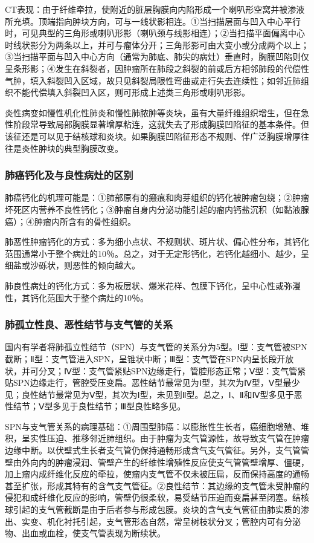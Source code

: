 CT表现：由于纤维牵拉，使附近的脏层胸膜向内陷形成一个喇叭形空窝并被渗液所充填。顶端指向肿块方向，可与一线状影相连。①当扫描层面与凹入中心平行时，可见典型的三角形或喇叭形影（喇叭颈与线影相连）；②当扫描平面偏离中心时线状影分为两条以上，并可与瘤体分开；三角形影可由大变小或分成两个以上；③当扫描平面与凹入中心方向（通常为肺底、肺尖的病灶）垂直时，胸膜凹陷则仅呈条形影；④发生在斜裂者，因肿瘤所在肺段之斜裂的前或后方相邻肺段的代偿性气肿，填入斜裂凹入区域，故只见斜裂局限性弯曲或走行失去连续性；如邻近肺组织不能代偿填入斜裂凹入区，则可形成上述类三角形或喇叭形影。

炎性病变如慢性机化性肺炎和慢性肺脓肿等炎块，虽有大量纤维组织增生，但在急性阶段常导致局部胸膜显著增厚粘连，这就失去了形成胸膜凹陷征的基本条件。但该征还是可以见于结核球和炎块。如果胸膜凹陷征形态不规则、伴广泛胸膜增厚往往是炎性肿块的典型胸膜改变。

\subsubsection{肺癌钙化及与良性病灶的区别}

肺癌钙化的机理可能是：①肺部原有的瘢痕和肉芽组织的钙化被肿瘤包绕；②肿瘤坏死区内营养不良性钙化；③肿瘤自身内分泌功能引起的瘤内钙盐沉积（如黏液腺癌）；④肿瘤内所含有的骨性组织。

肺恶性肿瘤钙化的方式：多为细小点状、不规则状、斑片状、偏心性分布，其钙化范围通常小于整个病灶的10％。总之，对于无定形钙化，若钙化越细小、越少，呈细盐或沙砾状，则恶性的倾向越大。

肺良性病灶的钙化方式：多为板层状、爆米花样、包膜下钙化，呈中心性或弥漫性，其钙化范围大于整个病灶的10％。

\subsubsection{肺孤立性良、恶性结节与支气管的关系}

国内有学者将肺孤立性结节（SPN）与支气管的关系分为5型。Ⅰ型：支气管被SPN截断；Ⅱ型：支气管进入SPN，呈锥状中断；Ⅲ型：支气管在SPN内呈长段开放状，并可分叉；Ⅳ型：支气管紧贴SPN边缘走行，管腔形态正常；Ⅴ型：支气管紧贴SPN边缘走行，管腔受压变扁。恶性结节最常见为Ⅰ型，其次为Ⅳ型，Ⅴ型最少见；良性结节最常见为Ⅴ型，其次为Ⅰ型，未见到Ⅱ型。总之，Ⅰ、Ⅱ和Ⅳ型多见于恶性结节；Ⅴ型多见于良性结节；Ⅲ型良性略多见。

SPN与支气管关系的病理基础：①周围型肺癌：以膨胀性生长者，癌细胞增殖、堆积，呈实性压迫、推移邻近肺组织。由于肿瘤为支气管源性，故导致支气管在肿瘤边缘中断。以伏壁式生长者支气管仍保持通畅形成含气支气管征。另外，支气管管壁由外向内的肿瘤浸润、管壁产生的纤维性增殖性反应使支气管管壁增厚、僵硬，加上瘤内成纤维化反应的牵拉，使瘤内支气管不仅未被压扁，反而保持高度的通畅甚至扩张，形成其特有的含气支气管征。②良性结节：其边缘的支气管未受肿瘤的侵犯和成纤维化反应的影响，管壁仍很柔软，易受结节压迫而变扁甚至闭塞。结核球引起的支气管截断是由于后者参与形成包膜。炎块的含气支气管征由肺实质的渗出、实变、机化衬托引起，支气管形态自然，常呈树枝状分叉；管腔内可有分泌物、出血或血栓，使支气管表现为断续状。


